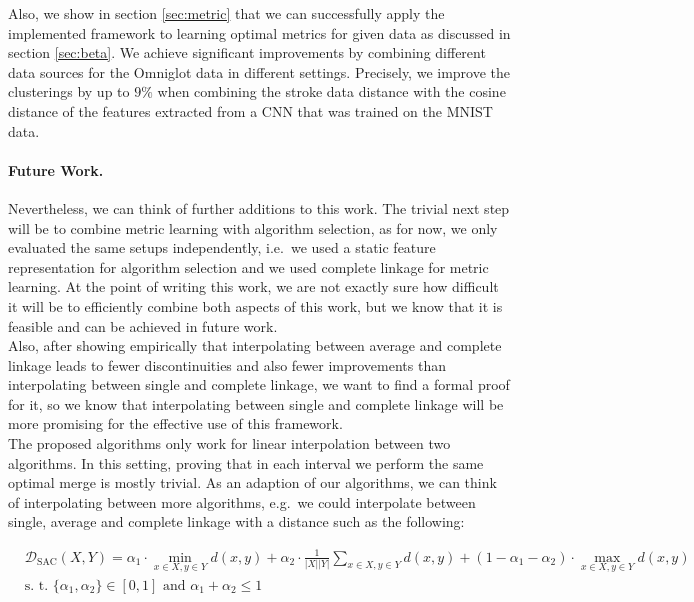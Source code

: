 Also, we show in section \ref{sec:metric} that we can successfully apply the implemented framework to learning optimal metrics for given data as discussed in section \ref{sec:beta}. We achieve significant improvements by combining different data sources for the Omniglot data in different settings. Precisely, we improve the clusterings by up to $9\%$ when combining the stroke data distance with the cosine distance of the features extracted from a CNN that was trained on the MNIST data.

\paragraph{Future Work.} Nevertheless, we can think of further additions to this work. The trivial next step will be to combine metric learning with algorithm selection, as for now, we only evaluated the same setups independently, i.e.\ we used a static feature representation for algorithm selection and we used complete linkage for metric learning. At the point of writing this work, we are not exactly sure how difficult it will be to efficiently combine both aspects of this work, but we know that it is feasible and can be achieved in future work.\\

Also, after showing empirically that interpolating between average and complete linkage leads to fewer discontinuities and also fewer improvements than interpolating between single and complete linkage, we want to find a formal proof for it, so we know that interpolating between single and complete linkage will be more promising for the effective use of this framework.\\ 

The proposed algorithms only work for linear interpolation between two algorithms. In this setting, proving that in each interval we perform the same optimal merge is mostly trivial. As an adaption of our algorithms, we can think of interpolating between more algorithms, e.g.\ we could interpolate between single, average and complete linkage with a distance such as the following:

\begin{align*}
&\mathcal{D}_\text{SAC}(X,Y) = \alpha_1 \cdot \min\limits_{x \in X, y \in Y} d(x,y) + \alpha_2 \cdot \frac{1}{|X||Y|} \sum\limits_{x \in X, y \in Y} d(x,y) + (1-\alpha_1-\alpha_2) \cdot \max\limits_{x \in X, y \in Y} d(x,y)\\
&\text{s. t. } \{\alpha_1, \alpha_2\} \in [0,1] \text{ and } \alpha_1 + \alpha_2 \le 1
\end{align*}

